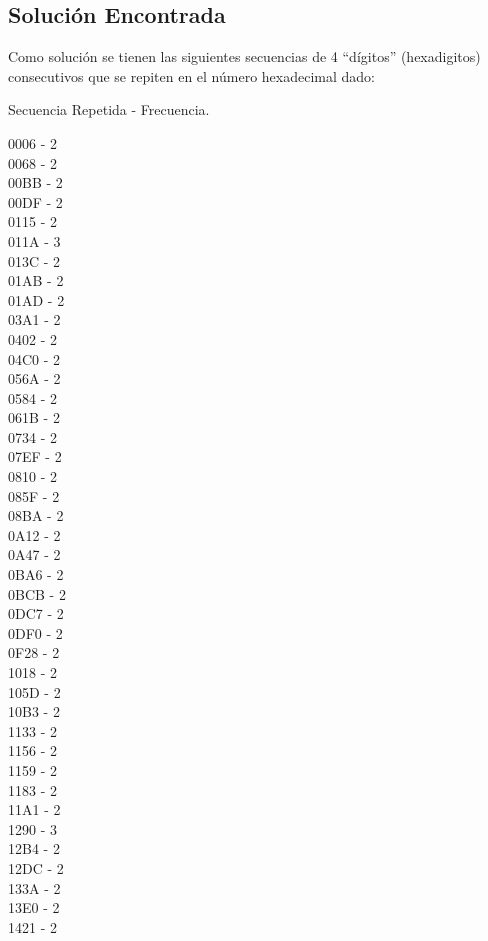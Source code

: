 \documentclass[10pt,letterpaper]{article}
\begin{document}
\subsection{Solución Encontrada}

Como solución se tienen las siguientes secuencias de 4 “dígitos” (hexadigitos) consecutivos que se repiten en el número hexadecimal dado:

Secuencia Repetida - Frecuencia.

0006 -  2\\
0068 -  2\\
00BB -  2\\
00DF -  2\\
0115 -  2\\
011A -  3\\
013C -  2\\
01AB -  2\\
01AD -  2\\
03A1 -  2\\
0402 -  2\\
04C0 -  2\\
056A -  2\\
0584 -  2\\
061B -  2\\
0734 -  2\\
07EF -  2\\
0810 -  2\\
085F -  2\\
08BA -  2\\
0A12 -  2\\
0A47 -  2\\
0BA6 -  2\\
0BCB -  2\\
0DC7 -  2\\
0DF0 -  2\\
0F28 -  2\\
1018 -  2\\
105D -  2\\
10B3 -  2\\
1133 -  2\\
1156 -  2\\
1159 -  2\\
1183 -  2\\
11A1 -  2\\
1290 -  3\\
12B4 -  2\\
12DC -  2\\
133A -  2\\
13E0 -  2\\
1421 -  2\\
\end{document}
